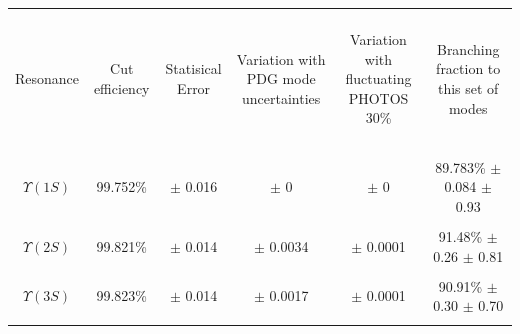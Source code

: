 \documentclass[landscape]{article}
\begin{document}
\begin{center}
  \begin{tabular}{c | c c c c | c}
    \hline\hline
    & & & & & \\
    \begin{minipage}{3 cm} \begin{center} Resonance \end{center} \end{minipage} &
    \begin{minipage}{2 cm} \begin{center} Cut efficiency \end{center} \end{minipage} &
    \begin{minipage}{2 cm} \begin{center} Statisical Error \end{center} \end{minipage} &
    \begin{minipage}{4 cm} \begin{center} Variation with PDG mode uncertainties \end{center} \end{minipage} &
    \begin{minipage}{4 cm} \begin{center} Variation with fluctuating PHOTOS 30\% \end{center} \end{minipage} &
    \begin{minipage}{3 cm} \begin{center} Branching fraction to this set of modes \end{center} \end{minipage} \\
    & & & & & \\\hline
    & & & & & \\
    $\Upsilon(1S)$ & 99.752\% & $\pm$ 0.016 & $\pm$ 0 & $\pm$ 0 & 89.783\% $\pm$ 0.084 {\color{blue} $\pm$ 0.93} \\
    & & & & & \\
    $\Upsilon(2S)$ & 99.821\% & $\pm$ 0.014 & $\pm$ 0.0034 & $\pm$ 0.0001 & 91.48\% $\pm$ 0.26 {\color{blue} $\pm$ 0.81} \\
    & & & & & \\
    $\Upsilon(3S)$ & 99.823\% & $\pm$ 0.014 & $\pm$ 0.0017 & $\pm$ 0.0001 & 90.91\% $\pm$ 0.30 {\color{blue} $\pm$ 0.70} \\
    & & & & & \\\hline\hline
  \end{tabular}
\end{center}
\end{document}
